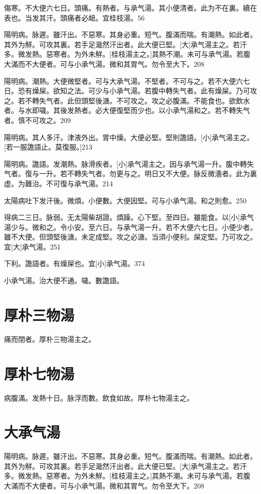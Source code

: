 \documentclass[12pt,oneside,UTF8,b5paper]{ctexbook}她她她她她她她
\begin{document}
傷寒。不大便六七日。頭痛。有熱者。与承气湯。其小便清者。此为不在裏。續在表也。当发其汗。頭痛者必衄。宜桂枝湯。56

陽明病。脉遲。雖汗出。不惡寒。其身必重。短气。腹滿而喘。有潮熱。如此者。其外为觧。可攻其裏。若手足濈然汗出者。此大便已堅。[大]承气湯主之。若汗多。微发熱。惡寒者。为外未觧。[桂枝湯主之。]其熱不潮。未可与承气湯。若腹大滿而不大便者。可与小承气湯。微和其胃气。勿令至大下。208

陽明病。潮熱。大便微堅者。可与大承气湯。不堅者。不可与之。若不大便六七日。恐有燥屎。欲知之法。可少与小承气湯。若腹中轉失气者。此有燥屎。乃可攻之。若不轉失气者。此但頭堅後溏。不可攻之。攻之必腹滿。不能食也。欲飲水者。与水即噦。其後发熱者。必大便復堅而少也。以小承气湯和之。若不轉失气者。慎不可攻之。209

陽明病。其人多汗。津液外出。胃中燥。大便必堅。堅則譫語。[小]承气湯主之。[若一服譫語止。莫復服。]213

陽明病。譫語。发潮熱。脉滑疾者。[小]承气湯主之。因与承气湯一升。腹中轉失气者。復与一升。若不轉失气者。勿更与之。明日又不大便。脉反微濇者。此为裏虚。为難治。不可復与承气湯。214

太陽病吐下发汗後。微煩。小便數。大便因堅。可与小承气湯。和之則愈。250

得病二三日。脉弱。无太陽柴胡證。煩躁。心下堅。至四日。雖能食。以[小]承气湯少与。微和之。令小安。至六日。与承气湯一升。若不大便六七日。小便少者。雖不大便。但頭堅後溏。未定成堅。攻之必溏。当須小便利。屎定堅。乃可攻之。宜[大]承气湯。251

下利。譫語者。有燥屎也。宜[小]承气湯。374

小承气湯。治大便不通。噦。數譫語。

\section{厚朴三物湯}

痛而閉者。厚朴三物湯主之。

\section{厚朴七物湯}

病腹滿。发熱十日。脉浮而數。飲食如故。厚朴七物湯主之。

\section{大承气湯}

陽明病。脉遲。雖汗出。不惡寒。其身必重。短气。腹滿而喘。有潮熱。如此者。其外为觧。可攻其裏。若手足濈然汗出者。此大便已堅。[大]承气湯主之。若汗多。微发熱。惡寒者。为外未觧。[桂枝湯主之。]其熱不潮。未可与承气湯。若腹大滿而不大便者。可与小承气湯。微和其胃气。勿令至大下。208
\end{document}
